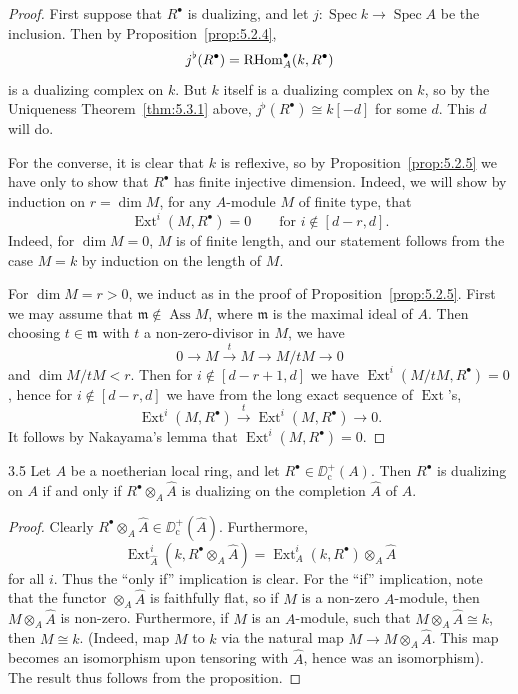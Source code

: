 \begin{proof}
First suppose that $R^\bullet$ is dualizing, and let $j\colon\operatorname{Spec}k\longrightarrow\operatorname{Spec}A$ be the inclusion. Then by Proposition~\ref{prop:5.2.4},
\[
j^{\flat}(R^{\bullet}) = \operatorname{RHom}_A^{\bullet}(k,R^{\bullet})
\]
is a dualizing complex on $k$. But $k$ itself is a dualizing complex on $k$, so by the Uniqueness Theorem~\ref{thm:5.3.1} above, $j^{\flat}(R^{\bullet})\cong k[-d]$ for some $d$. This $d$ will do.

For the converse, it is clear that $k$ is reflexive, so by Proposition~\ref{prop:5.2.5} we have only to show that $R^\bullet$ has finite injective dimension. Indeed, we will show by induction on $r=\dim M$, for any $A$-module $M$ of finite type, that
\[
\operatorname{Ext}^{i}(M,R^{\bullet}) = 0 \qquad\text{for } i\notin[d-r,d].
\]
Indeed, for $\dim M=0$, $M$ is of finite length, and our statement follows from the case $M=k$ by induction on the length of $M$.

For $\dim M=r>0$, we induct as in the proof of Proposition~\ref{prop:5.2.5}. First we may assume that $\mathfrak{m}\notin\operatorname{Ass}M$, where $\mathfrak{m}$ is the maximal ideal of $A$. Then choosing $t\in\mathfrak{m}$ with $t$ a non-zero-divisor in $M$, we have
\[
0\longrightarrow M\xrightarrow{t} M\longrightarrow M/tM\longrightarrow 0
\]
and $\dim M/tM<r$. Then for $i\notin[d-r+1,d]$ we have $\operatorname{Ext}^i(M/tM,R^\bullet)=0$, hence for $i\notin[d-r,d]$ we have from the long exact sequence of $\operatorname{Ext}$'s,
\[
\operatorname{Ext}^{i}(M,R^{\bullet})\xrightarrow{t}\operatorname{Ext}^{i}(M,R^{\bullet})\longrightarrow 0.
\]
It follows by Nakayama's lemma that $\operatorname{Ext}^{i}(M,R^{\bullet})=0$.
\end{proof}

\begin{bookcorollary}{3.5}\label{cor:5.3.5}
Let $A$ be a noetherian local ring, and let $R^\bullet\in\DD^+_{\mathrm{c}}(A)$. Then $R^\bullet$ is dualizing on $A$ if and only if $R^\bullet\otimes_{A}\widehat{A}$ is dualizing on the completion $\widehat{A}$ of $A$.
\end{bookcorollary}

\begin{proof}
Clearly $R^\bullet\otimes_{A}\widehat{A}\in\DD_{\mathrm{c}}^{+}(\widehat{A})$. Furthermore,
\[
\operatorname{Ext}_{\widehat{A}}^{i}(k, R^{\bullet}\otimes_{A}\widehat{A}) = \operatorname{Ext}_{A}^{i}(k, R^{\bullet})\otimes_{A}\widehat{A}
\]
for all $i$. Thus the ``only if'' implication is clear. For the ``if'' implication, note that the functor $\otimes_{A}\widehat{A}$ is faithfully flat, so if $M$ is a non-zero $A$-module, then $M\otimes_{A}\widehat{A}$ is non-zero. Furthermore, if $M$ is an $A$-module, such that $M\otimes_{A}\widehat{A}\cong k$, then $M\cong k$. (Indeed, map $M$ to $k$ via the natural map $M\to M\otimes_{A}\widehat{A}$. This map becomes an isomorphism upon tensoring with $\widehat{A}$, hence was an isomorphism). The result thus follows from the proposition.
\end{proof}

